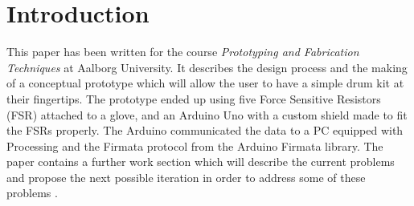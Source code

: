 \section*{Introduction}
\label{Introduktion}
This paper has been written for the course \textit{Prototyping and Fabrication Techniques} at Aalborg University. It describes the design process and the making of a conceptual prototype which will allow the user to have a simple drum kit at their fingertips. The prototype ended up using five Force Sensitive Resistors (FSR) attached to a glove, and an Arduino Uno with a custom shield made to fit the FSRs properly. The Arduino communicated the data to a PC equipped with Processing and the Firmata protocol from the Arduino Firmata library. The paper contains a further work section which will describe the current problems and propose the next possible iteration in order to address some of these problems .
